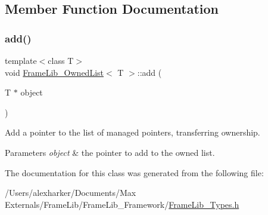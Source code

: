 \subsection{Member Function Documentation}
\mbox{\label{struct_frame_lib___owned_list_a9c7d0ad8bf68242a3889794039903d40}} 
\subsubsection{\texorpdfstring{add()}{add()}}
{\footnotesize\ttfamily template$<$class T$>$ \\
void \hyperlink{struct_frame_lib___owned_list}{Frame\+Lib\+\_\+\+Owned\+List}$<$ T $>$\+::add (\begin{DoxyParamCaption}\item[{T $\ast$}]{object }\end{DoxyParamCaption})\hspace{0.3cm}{\ttfamily [inline]}}

Add a pointer to the list of managed pointers, transferring ownership.


\begin{DoxyParams}{Parameters}
{\em object} & the pointer to add to the owned list. \\
\hline
\end{DoxyParams}


The documentation for this class was generated from the following file\+:\begin{DoxyCompactItemize}
\item 
/\+Users/alexharker/\+Documents/\+Max Externals/\+Frame\+Lib/\+Frame\+Lib\+\_\+\+Framework/\hyperlink{_frame_lib___types_8h}{Frame\+Lib\+\_\+\+Types.\+h}\end{DoxyCompactItemize}
